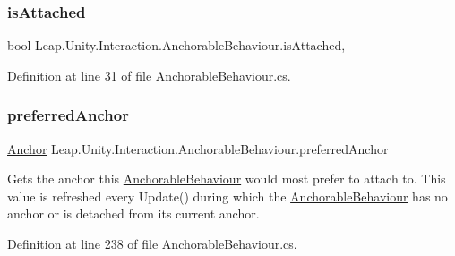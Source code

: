 \subsubsection{\texorpdfstring{isAttached}{isAttached}}
{\footnotesize\ttfamily bool Leap.\+Unity.\+Interaction.\+Anchorable\+Behaviour.\+is\+Attached\hspace{0.3cm}{\ttfamily [get]}, {\ttfamily [set]}}



Definition at line 31 of file Anchorable\+Behaviour.\+cs.

\mbox{\label{class_leap_1_1_unity_1_1_interaction_1_1_anchorable_behaviour_ab82e05ed50e6b2de8cad02a53efec6d4}} 
\subsubsection{\texorpdfstring{preferredAnchor}{preferredAnchor}}
{\footnotesize\ttfamily \mbox{\hyperlink{class_leap_1_1_unity_1_1_interaction_1_1_anchor}{Anchor}} Leap.\+Unity.\+Interaction.\+Anchorable\+Behaviour.\+preferred\+Anchor\hspace{0.3cm}{\ttfamily [get]}}



Gets the anchor this \mbox{\hyperlink{class_leap_1_1_unity_1_1_interaction_1_1_anchorable_behaviour}{Anchorable\+Behaviour}} would most prefer to attach to. This value is refreshed every Update() during which the \mbox{\hyperlink{class_leap_1_1_unity_1_1_interaction_1_1_anchorable_behaviour}{Anchorable\+Behaviour}} has no anchor or is detached from its current anchor. 



Definition at line 238 of file Anchorable\+Behaviour.\+cs.

\mbox{\label{class_leap_1_1_unity_1_1_interaction_1_1_anchorable_behaviour_aaa63f2fc2253c8a559150fb0127730f5}} 
